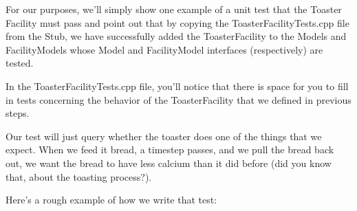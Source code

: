 \documentclass[letterpaper,10pt,english]{sphinxmanual}
\begin{document}
For our purposes, we'll simply show one example of a unit test that the Toaster
Facility must pass and point out that by copying the ToasterFacilityTests.cpp
file from the Stub, we have successfully added the ToasterFacility to the
Models and FacilityModels whose Model and FacilityModel interfaces
(respectively) are tested.

In the ToasterFacilityTests.cpp file, you'll notice that there is space for you
to fill in tests concerning the behavior of the ToasterFacility that we defined
in previous steps.

Our test will just query whether the toaster does one of the things that we
expect. When we feed it bread, a timestep passes, and we pull the bread back
out, we want the bread to have less calcium than it did before (did you know
that, about the toasting process?).

Here's a rough example of how we write that test:
\end{document}
